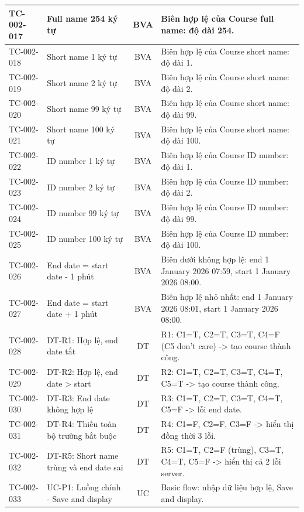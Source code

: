 {\begin{longtable}{|l|L{4.4cm}|c|L{6.4cm}|}
TC-002-017 & Full name 254 ký tự & BVA & Biên hợp lệ của Course full name: độ dài 254. \\ \hline
TC-002-018 & Short name 1 ký tự & BVA & Biên hợp lệ của Course short name: độ dài 1. \\ \hline
TC-002-019 & Short name 2 ký tự & BVA & Biên hợp lệ của Course short name: độ dài 2. \\ \hline
TC-002-020 & Short name 99 ký tự & BVA & Biên hợp lệ của Course short name: độ dài 99. \\ \hline
TC-002-021 & Short name 100 ký tự & BVA & Biên hợp lệ của Course short name: độ dài 100. \\ \hline
TC-002-022 & ID number 1 ký tự & BVA & Biên hợp lệ của Course ID number: độ dài 1. \\ \hline
TC-002-023 & ID number 2 ký tự & BVA & Biên hợp lệ của Course ID number: độ dài 2. \\ \hline
TC-002-024 & ID number 99 ký tự & BVA & Biên hợp lệ của Course ID number: độ dài 99. \\ \hline
TC-002-025 & ID number 100 ký tự & BVA & Biên hợp lệ của Course ID number: độ dài 100. \\ \hline
TC-002-026 & End date = start date - 1 phút & BVA & Biên dưới không hợp lệ: end 1 January 2026 07:59, start 1 January 2026 08:00. \\ \hline
TC-002-027 & End date = start date + 1 phút & BVA & Biên hợp lệ nhỏ nhất: end 1 January 2026 08:01, start 1 January 2026 08:00. \\ \hline
TC-002-028 & DT-R1: Hợp lệ, end date tắt & DT & R1: C1=T, C2=T, C3=T, C4=F (C5 don't care) -\textgreater{} tạo course thành công. \\ \hline
TC-002-029 & DT-R2: Hợp lệ, end date \textgreater{} start & DT & R2: C1=T, C2=T, C3=T, C4=T, C5=T -\textgreater{} tạo course thành công. \\ \hline
TC-002-030 & DT-R3: End date không hợp lệ & DT & R3: C1=T, C2=T, C3=T, C4=T, C5=F -\textgreater{} lỗi end date. \\ \hline
TC-002-031 & DT-R4: Thiếu toàn bộ trường bắt buộc & DT & R4: C1=F, C2=F, C3=F -\textgreater{} hiển thị đồng thời 3 lỗi. \\ \hline
TC-002-032 & DT-R5: Short name trùng và end date sai & DT & R5: C1=T, C2=F (trùng), C3=T, C4=T, C5=F -\textgreater{} hiển thị cả 2 lỗi server. \\ \hline
TC-002-033 & UC-P1: Luồng chính - Save and display & UC & Basic flow: nhập dữ liệu hợp lệ, Save and display. \\ \hline

\end{longtable}}
